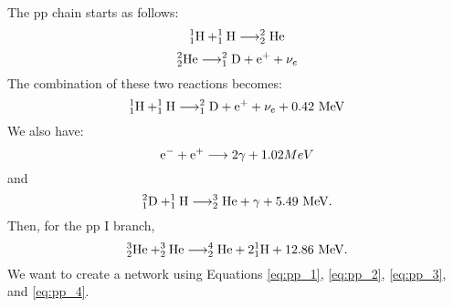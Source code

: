 \documentclass[12pt,preprint]{aastex}
\begin{document}
The pp chain starts as follows:
\begin{equation}
^1_1{\rm H} + ^1_1{\rm H} \longrightarrow ^2_2{\rm He}
\end{equation}
\begin{equation}
^2_2{\rm He} \longrightarrow ^2_1{\rm D} + {\rm e}^+ + \nu_e
\end{equation}
The combination of these two reactions becomes:
\begin{equation}
^1_1{\rm H} + ^1_1{\rm H} \longrightarrow ^2_1{\rm D} + {\rm e}^+ + \nu_e + 0.42~{\rm MeV}
\label{eq:pp_1}
\end{equation}
We also have:
\begin{equation}
{\rm e}^- + {\rm e}^+ \longrightarrow 2\gamma + 1.02 MeV
\label{eq:pp_2}
\end{equation}
and
\begin{equation}
^2_1{\rm D} + ^1_1{\rm H} \longrightarrow ^3_2{\rm He} + \gamma + 5.49~{\rm MeV}.
\label{eq:pp_3}
\end{equation}
Then, for the pp I branch, 
\begin{equation}
^3_2{\rm He} + ^3_2{\rm He} \longrightarrow ^4_2{\rm He} + 2^1_1{\rm H} + 12.86~{\rm MeV}.
\label{eq:pp_4}
\end{equation}
We want to create a network using Equations \ref{eq:pp_1}, \ref{eq:pp_2}, \ref{eq:pp_3}, and \ref{eq:pp_4}.


% 
%

%
\end{document}
